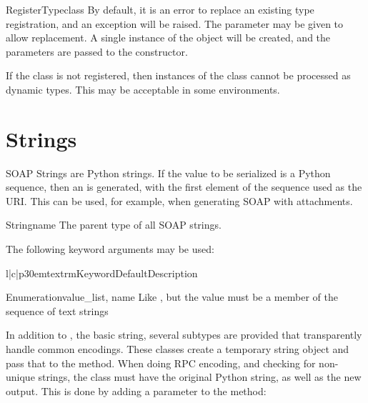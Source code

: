 \begin{funcdesc}{RegisterType}{class}
By default, it is an error to replace an existing type registration, and
an exception will be raised.
The  parameter may be given to allow replacement.
A single instance of the  object will be created, and
the  parameters are passed to the constructor.
\end{funcdesc}

If the class is not registered, then instances of the class cannot be
processed as dynamic types.
This may be acceptable in some environments.

\section{Strings}

SOAP Strings are Python strings.
If the value to be serialized is a Python sequence, then an 
is generated, with the first element of the sequence used as the URI.
This can be used, for example, when generating SOAP with attachments.

\begin{classdesc}{String}{name}
The parent type of all SOAP strings.

The following keyword arguments may be used:

\begin{tableiii}{l|c|p{30em}}{textrm}{Keyword}{Default}{Description}
\end{tableiii}
\end{classdesc}

\begin{classdesc}{Enumeration}{value_list, name}
Like , but the value must be a member of
the  sequence of text strings
\end{classdesc}

In addition to ,
the basic string, several subtypes are provided that transparently
handle common encodings.
These classes create a temporary string object and pass that to
the  method.
When doing RPC encoding, and checking for non-unique strings, the
 class must have the original Python string, as well
as the new output.
This is done by adding a parameter to the  method:

